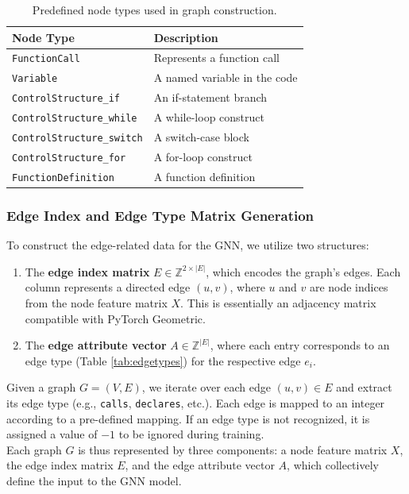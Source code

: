 \documentclass{article}
\begin{document}
\begin{table}[h]
\centering
\begin{tabular}{ll}
\hline
\textbf{Node Type} & \textbf{Description} \\
\hline
\texttt{FunctionCall} & Represents a function call \\
\texttt{Variable} & A named variable in the code \\
\texttt{ControlStructure\_if} & An if-statement branch \\
\texttt{ControlStructure\_while} & A while-loop construct \\
\texttt{ControlStructure\_switch} & A switch-case block \\
\texttt{ControlStructure\_for} & A for-loop construct \\
\texttt{FunctionDefinition} & A function definition\\
\hline
\end{tabular}
\caption{Predefined node types used in graph construction.}
\label{tab:nodetypes}
\end{table}

\subsubsection{Edge Index and Edge Type Matrix Generation}
To construct the edge-related data for the GNN, we utilize two structures:

\begin{enumerate}
    \item The \textbf{edge index matrix} $E \in \mathbb{Z}^{2 \times |E|}$, which encodes the graph's edges. Each column represents a directed edge $(u, v)$, where $u$ and $v$ are node indices from the node feature matrix $X$. This is essentially an adjacency matrix compatible with PyTorch Geometric.
    \item The \textbf{edge attribute vector} $A \in \mathbb{Z}^{|E|}$, where each entry corresponds to an edge type (Table \ref{tab:edgetypes}) for the respective edge $e_i$.
\end{enumerate}
Given a graph $G = (V, E)$, we iterate over each edge $(u, v) \in E$ and extract its edge type (e.g., \texttt{calls}, \texttt{declares}, etc.). Each edge is mapped to an integer according to a pre-defined mapping. If an edge type is not recognized, it is assigned a value of $-1$ to be ignored during training. \\

Each graph $G$ is thus represented by three components: a node feature matrix $X$, the edge index matrix $E$, and the edge attribute vector $A$, which collectively define the input to the GNN model.
\end{document}
